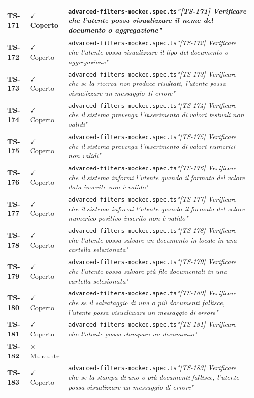 \documentclass[a4paper,12pt]{article}
\newcommand{\ok}{\textcolor{green!60!black}{$\checkmark$ Coperto}}
\newcommand{\ko}{\textcolor{red!80!black}{$\times$ Mancante}}
\newcommand{\f}[1]{\nolinkurl{#1}\newline}
\newcommand{\q}[1]{\textit{#1}}
\begin{document}
\begin{longtable}{|p{1.5cm}|p{3.0cm}|p{10.5cm}|}
\textbf{TS-171} & \ok & \f{advanced-filters-mocked.spec.ts}\q{"[TS-171] Verificare che l'utente possa visualizzare il nome del documento o aggregazione"} \\ \hline
\textbf{TS-172} & \ok & \f{advanced-filters-mocked.spec.ts}\q{"[TS-172] Verificare che l'utente possa visualizzare il tipo del documento o aggregazione"} \\ \hline
\textbf{TS-173} & \ok & \f{advanced-filters-mocked.spec.ts}\q{"[TS-173] Verificare che se la ricerca non produce risultati, l'utente possa visualizzare un messaggio di errore"} \\ \hline
\textbf{TS-174} & \ok & \f{advanced-filters-mocked.spec.ts}\q{"[TS-174] Verificare che il sistema prevenga l'inserimento di valori testuali non validi"} \\ \hline
\textbf{TS-175} & \ok & \f{advanced-filters-mocked.spec.ts}\q{"[TS-175] Verificare che il sistema prevenga l'inserimento di valori numerici non validi"} \\ \hline
\textbf{TS-176} & \ok & \f{advanced-filters-mocked.spec.ts}\q{"[TS-176] Verificare che il sistema informi l'utente quando il formato del valore data inserito non è valido"} \\ \hline
\textbf{TS-177} & \ok & \f{advanced-filters-mocked.spec.ts}\q{"[TS-177] Verificare che il sistema informi l'utente quando il formato del valore numerico positivo inserito non è valido"} \\ \hline
\textbf{TS-178} & \ok & \f{advanced-filters-mocked.spec.ts}\q{"[TS-178] Verificare che l'utente possa salvare un documento in locale in una cartella selezionata"} \\ \hline
\textbf{TS-179} & \ok & \f{advanced-filters-mocked.spec.ts}\q{"[TS-179] Verificare che l'utente possa salvare più file documentali in una cartella selezionata"} \\ \hline
\textbf{TS-180} & \ok & \f{advanced-filters-mocked.spec.ts}\q{"[TS-180] Verificare che se il salvataggio di uno o più documenti fallisce, l'utente possa visualizzare un messaggio di errore"} \\ \hline
\textbf{TS-181} & \ok & \f{advanced-filters-mocked.spec.ts}\q{"[TS-181] Verificare che l'utente possa stampare un documento"} \\ \hline
\textbf{TS-182} & \ko & - \\ \hline
\textbf{TS-183} & \ok & \f{advanced-filters-mocked.spec.ts}\q{"[TS-183] Verificare che se la stampa di uno o più documenti fallisce, l'utente possa visualizzare un messaggio di errore"} \\ \hline

\end{longtable}
\end{document}

